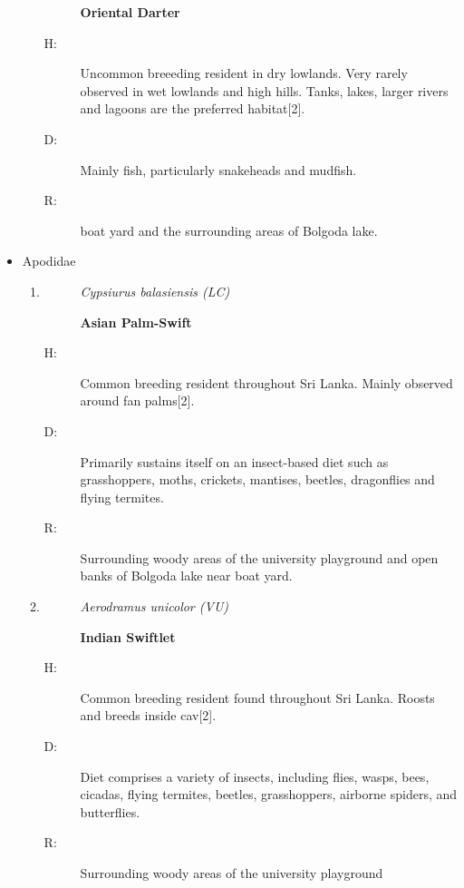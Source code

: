 \begin{itemize}
\begin{enumerate}
\begin{description}
\item[]%
\textbf{Oriental Darter}%
\end{description}%
\begin{description}%
\item[H: ]%
Uncommon breeeding resident in dry lowlands. Very rarely observed in wet lowlands and high hills. Tanks, lakes, larger rivers and lagoons are the preferred habitat{[}2{]}.%
\item[D: ]%
Mainly fish, particularly snakeheads and mudfish.%
\item[R: ]%
boat yard and the surrounding areas of Bolgoda lake.%
\end{description}%
\end{enumerate}%
\item%
Apodidae%
\begin{enumerate}%
\item%
\begin{description}%
\item[]%
\textit{Cypsiurus balasiensis (LC)}%
\item[]%
\textbf{Asian Palm{-}Swift}%
\end{description}%
\begin{description}%
\item[H: ]%
Common breeding resident throughout Sri Lanka. Mainly observed around fan palms{[}2{]}.%
\item[D: ]%
Primarily sustains itself on an insect{-}based diet such as grasshoppers, moths, crickets, mantises, beetles, dragonflies and flying termites.%
\item[R: ]%
Surrounding woody areas of the university playground and open banks of Bolgoda lake near boat yard.%
\end{description}%
\item%
\begin{description}%
\item[]%
\textit{Aerodramus unicolor (VU)}%
\item[]%
\textbf{Indian Swiftlet}%
\end{description}%
\begin{description}%
\item[H: ]%
Common breeding resident found throughout Sri Lanka. Roosts and breeds inside cav{[}2{]}.%
\item[D: ]%
Diet comprises a variety of insects, including flies, wasps, bees, cicadas, flying termites, beetles, grasshoppers, airborne spiders, and butterflies.%
\item[R: ]%
Surrounding woody areas of the university playground%

\end{description}
\end{enumerate}
\end{itemize}
